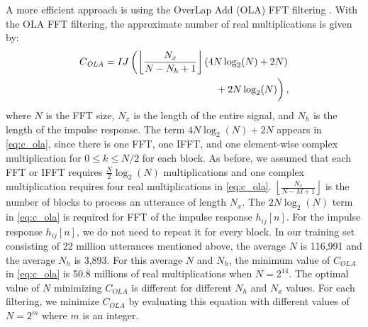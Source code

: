 \documentclass[a4paper]{article}
\begin{document}
A more efficient approach is using the OverLap Add (OLA)
FFT filtering \cite{A_V_Oppenheim_PrenticeHall_1999, 
r_crochiere_ieee_tassp_1980_00}.
With the OLA FFT filtering,
the approximate number of real multiplications is given by:
\begin{align}
  C_{\textit{OLA}} = I J \left( 
          \left \lfloor{\frac{N_x}{N - N_h + 1}}\right \rfloor
          \left(4 N \log_2(N) + 2 N  \right)   \right.  \nonumber \\
           \left.
                   \vphantom{\left \lfloor{\frac{N_x}{N - M + 1}}\right \rfloor}
            + 2 N \log_2(N) \right),
  \label{eq:c_ola}
\end{align}
where $N$ is the FFT size, $N_x$ is the length of the entire
signal, and $N_h$ is the length of the impulse response. The term
$4 N \log_2(N) + 2 N $ appears in \eqref{eq:c_ola}, since there is
one FFT, one IFFT, and one element-wise complex multiplication
for $0 \le k \le N / 2$ for each block.
As before, we assumed that each FFT or IFFT requires
$\frac{N}{2} \log_2(N)$ multiplications and one complex multiplication
requires four real multiplications in \eqref{eq:c_ola}.
$\left \lfloor{\frac{N_x}{N - M + 1}}\right \rfloor$
is the number of blocks to process an utterance of length $N_x$.
The $2 N \log_2(N)$ term in \eqref{eq:c_ola} is required for
FFT of the impulse response $h_{ij}[n]$.
For the impulse response $h_{ij}[n]$, we do not
need to repeat it for every block.
In our training set consisting of 22 million utterances mentioned above,
the average $N$ is 116,991 and the average $N_h$ is 3,893.
For this average $N$ and $N_h$, the minimum value of $C_{\textit{OLA}}$
in \eqref{eq:c_ola} is 50.8 millions of real multiplications when $N = 2^{14}$.
The optimal value of $N$ minimizing $C_{\textit{OLA}}$ is different for
different $N_h$ and $N_x$ values. For each filtering, we minimize
$C_{\textit{OLA}}$ by evaluating this equation with different values of
$N = 2^{m}$ where $m$ is an integer.
%
%
%
%
\end{document}
